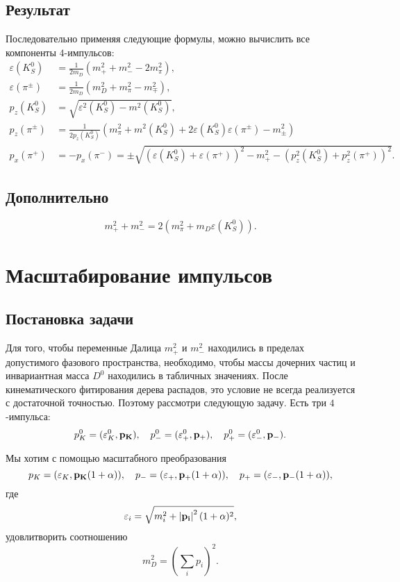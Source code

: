 \documentclass[a4paper,10pt]{article}
\newcommand{\mksq}{\ensuremath{m^2\left(K_S^0\right)}\xspace}
\newcommand{\mpsq}{\ensuremath{m_+^2}\xspace}
\newcommand{\mmsq}{\ensuremath{m_-^2}\xspace}
\newcommand{\mmpsq}{\ensuremath{m_{\mp}^2}\xspace}
\newcommand{\ek}{\ensuremath{\varepsilon\left(K_S^0\right)}\xspace}
\newcommand{\eksq}{\ensuremath{\varepsilon^2\left(K_S^0\right)}\xspace}
\newcommand{\epp}{\ensuremath{\varepsilon\left(\pi^+\right)}\xspace}
\newcommand{\eppm}{\ensuremath{\varepsilon\left(\pi^{\pm}\right)}\xspace}
\newcommand{\pimodsq}{\ensuremath{\left|{\bf p_i}\right|^2}\xspace}
\begin{document}
\subsection{Результат}
Последовательно применяя следующие формулы, можно вычислить все компоненты $4$-импульсов:
\begin{equation}
 \begin{split}
  \ek  &= \frac{1}{2m_D}\left(\mpsq + \mmsq - 2m_{\pi}^2\right),\\
  \eppm &= \frac{1}{2m_D}\left(m_D^2 + m_{\pi}^2 - \mmpsq\right),\\
  p_z(K_S^0) & = \sqrt{\eksq-\mksq},\\
  p_z(\pi^{\pm}) &= \frac{1}{2p_z(K_S^0)}\left(m_{\pi}^2+\mksq+2\ek\eppm-m_{\pm}^2\right)\\
  p_x(\pi^+) &= -p_x(\pi^-) = \pm\sqrt{(\ek+\epp)^2-\mpsq - (p^2_z(K_S^0)+p^2_z(\pi^+))^2}.
 \end{split}
\end{equation}

\subsection{Дополнительно}
\begin{equation}
 \mpsq + \mmsq =  2\left(m_{\pi}^2 + m_D\ek\right).
\end{equation}

\section{Масштабирование импульсов}
\subsection{Постановка задачи}
Для того, чтобы переменные Далица \mpsq и \mmsq находились в пределах допустимого фазового пространства, необходимо, чтобы массы дочерних частиц и инвариантная масса $D^0$ находились в табличных значениях. После кинематического фитирования дерева распадов, это условие не всегда реализуется с достаточной точностью. Поэтому рассмотри следующую задачу. Есть три $4$-импульса:
\begin{equation}
 p^0_{K}=(\varepsilon^0_K,{\bf p_K}),\quad p^0_{-}=(\varepsilon^0_+,{\bf p_+}),\quad p^0_{+}=(\varepsilon^0_-,{\bf p_-}).
\end{equation}

Мы хотим с помощью масштабного преобразования
\begin{equation}
 p_{K}=(\varepsilon_K,{\bf p_K}(1+\alpha)),\quad p_{-}=(\varepsilon_+,{\bf p_+}(1+\alpha)),\quad p_{+}=(\varepsilon_-,{\bf p_-}(1+\alpha)),
\end{equation}
где 
\begin{equation}
 \varepsilon_i = \sqrt{m_i^2+\pimodsq(1+\alpha)^2},
\end{equation}
удовлитворить соотношению
\begin{equation}\label{eq:condition}
 m_D^2 = \left(\sum_{i}p_i\right)^2.
\end{equation}
\end{document}
